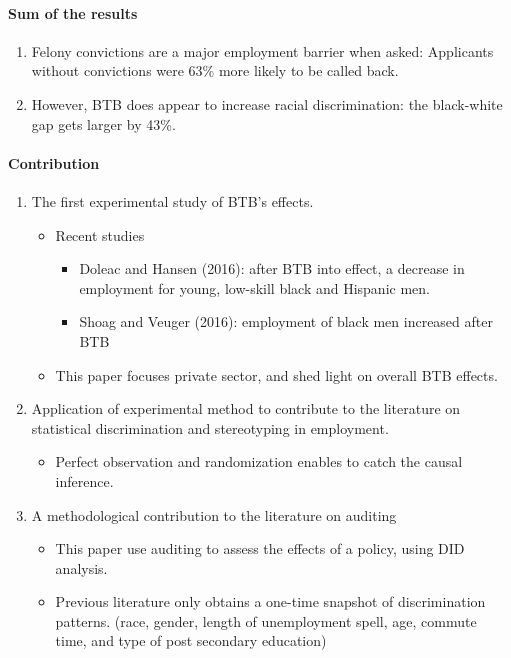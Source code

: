 \documentclass[../root]{subfiles}
\begin{document}
    \paragraph{Sum of the results}

    \begin{enumerate}
      \item Felony convictions are a major employment barrier when asked: Applicants without convictions were 63\% more likely to be called back.
      \item However, BTB does appear to increase racial discrimination: the black-white gap gets larger by 43\%.
    \end{enumerate}

    \paragraph{Contribution}

    \begin{enumerate}
      \item The first experimental study of BTB's effects.
      \begin{itemize}
        \item Recent studies
        \begin{itemize}
          \item Doleac and Hansen (2016): after BTB into effect, a decrease in employment for young, low-skill black and Hispanic men.
          \item Shoag and Veuger (2016): employment of black men increased after BTB
        \end{itemize}
        \item This paper focuses private sector, and shed light on overall BTB effects.
      \end{itemize}
      \item Application of experimental method to contribute to the literature on statistical discrimination and stereotyping in employment.
      \begin{itemize}
        \item Perfect observation and randomization enables to catch the causal inference.
      \end{itemize}
      \item A methodological contribution to the literature on auditing
      \begin{itemize}
        \item This paper use auditing to assess the effects of a policy, using DID analysis.
        \item Previous literature only obtains a one-time snapshot of discrimination patterns. (race, gender, length of unemployment spell, age, commute time, and type of post secondary education)
      \end{itemize}
    \end{enumerate}
\end{document}

